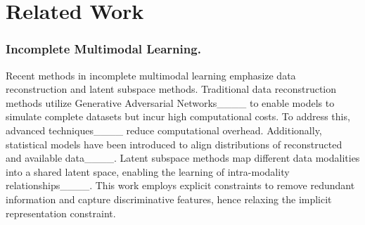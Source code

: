 \section{Related Work}
\subsubsection{Incomplete Multimodal Learning.} 
Recent methods in incomplete multimodal learning emphasize data reconstruction and latent subspace methods. Traditional data reconstruction methods utilize Generative Adversarial Networks____ to enable models to simulate complete datasets but incur high computational costs. To address this, advanced techniques____ reduce computational overhead. Additionally, statistical models have been introduced to align distributions of reconstructed and available data____. Latent subspace methods map different data modalities into a shared latent space, enabling the learning of intra-modality relationships____. This work employs explicit constraints to remove redundant information and capture discriminative features, hence relaxing the implicit representation constraint.

